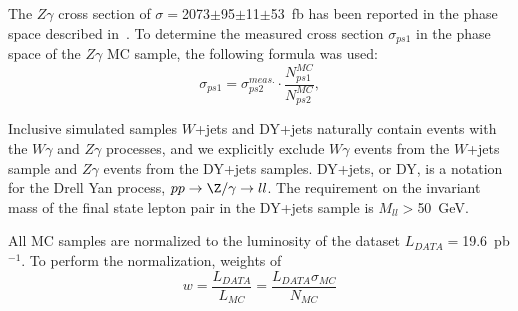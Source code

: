 The $Z\gamma$ cross section of $\sigma=$2073$\pm$95$\pm$11$\pm$53~fb has been reported in the phase space described in~\cite{ref_Zg8TeV}. To determine the measured cross section  $\sigma_{ps1}$ in the phase space of the $Z\gamma$ MC sample, the following formula was used:
\begin{equation}
\sigma_{ps1} = \sigma_{ps2}^{meas.} \cdot \frac{N_{ps1}^{MC}}{N_{ps2}^{MC}},
\end{equation}


Inclusive simulated samples $W$+jets and DY+jets naturally contain events with the $W\gamma$ and $Z\gamma$ processes, and we explicitly exclude $W\gamma$ events from the $W$+jets sample and $Z\gamma$ events from the DY+jets samples. DY+jets, or DY, is a notation for the Drell Yan process, $pp\rightarrow\Z/\gamma\rightarrow ll$. The requirement on the invariant mass of the final state lepton pair in the DY+jets sample is $M_{ll}>$50~GeV. 



All MC samples are normalized to the luminosity of the dataset $L_{DATA}=$19.6~pb$^{-1}$. To perform the normalization, weights of
\begin{equation}
  w = \frac{L_{DATA}}{L_{MC}} = \frac{L_{DATA} \sigma_{MC}}{N_{MC}}
\end{equation}

